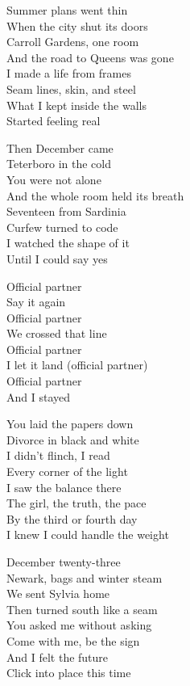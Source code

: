 \begin{lyrics}
Summer plans went thin\\
When the city shut its doors\\
Carroll Gardens, one room\\
And the road to Queens was gone\\
I made a life from frames\\
Seam lines, skin, and steel\\
What I kept inside the walls\\
Started feeling real

Then December came\\
Teterboro in the cold\\
You were not alone\\
And the whole room held its breath\\
Seventeen from Sardinia\\
Curfew turned to code\\
I watched the shape of it\\
Until I could say yes

Official partner\\
Say it again\\
Official partner\\
We crossed that line\\
Official partner\\
I let it land
(official partner)\\
Official partner\\
And I stayed

You laid the papers down\\
Divorce in black and white\\
I didn’t flinch, I read\\
Every corner of the light\\
I saw the balance there\\
The girl, the truth, the pace\\
By the third or fourth day\\
I knew I could handle the weight

December twenty-three\\
Newark, bags and winter steam\\
We sent Sylvia home\\
Then turned south like a seam\\
You asked me without asking\\
Come with me, be the sign\\
And I felt the future\\
Click into place this time


\end{lyrics}

